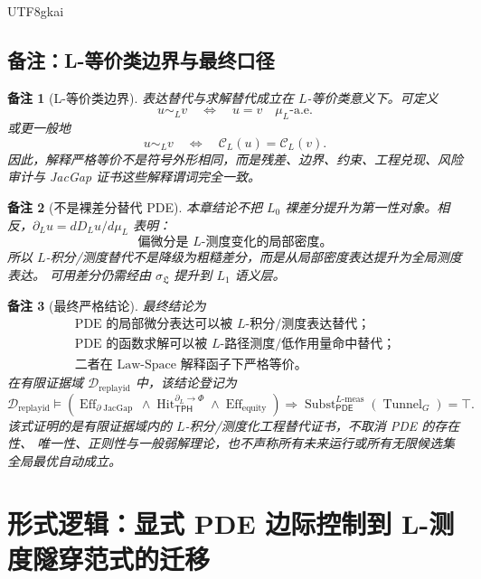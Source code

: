 \documentclass[12pt]{article}
\newtheorem{remark}{备注}[section]
\newcommand{\TPH}{\ensuremath{\mathsf{TPH}}}
\newcommand{\PDE}{\ensuremath{\mathsf{PDE}}}
\DeclareMathOperator{\Eff}{Eff}
\DeclareMathOperator{\Hit}{Hit}
\DeclareMathOperator{\JacGap}{JacGap}
\DeclareMathOperator{\Tunnel}{Tunnel}
\DeclareMathOperator{\Subst}{Subst}
\newcommand{\Lmeas}{L\text{-}\mathrm{meas}}
\begin{document}
\begin{CJK*}{UTF8}{gkai}
\subsection{备注：L-等价类边界与最终口径}
\label{subsec:tex58-l-measure-remarks}

\begin{remark}[L-等价类边界]
表达替代与求解替代成立在 \(L\)-等价类意义下。可定义
\[
  u\sim_L v
  \quad\Longleftrightarrow\quad
  u=v\quad \mu_L\text{-a.e.}
\]
或更一般地
\[
  u\sim_L v
  \quad\Longleftrightarrow\quad
  \mathcal C_L(u)=\mathcal C_L(v).
\]
因此，解释严格等价不是符号外形相同，而是残差、边界、约束、工程兑现、风险审计与 JacGap 证书这些解释谓词完全一致。
\end{remark}

\begin{remark}[不是裸差分替代 PDE]
本章结论不把 \(L_0\) 裸差分提升为第一性对象。相反，\(\partial_Lu=dD_Lu/d\mu_L\) 表明：
\[
  \boxed{
  \text{偏微分是 }L\text{-测度变化的局部密度。}
  }
\]
所以 \(L\)-积分/测度替代不是降级为粗糙差分，而是从局部密度表达提升为全局测度表达。
可用差分仍需经由 \(\sigma_{\mathfrak L}\) 提升到 \(L_1\) 语义层。
\end{remark}

\begin{remark}[最终严格结论]
最终结论为
\[
  \boxed{
  \begin{gathered}
  \text{PDE 的局部微分表达可以被 }L\text{-积分/测度表达替代；}\\
  \text{PDE 的函数求解可以被 }L\text{-路径测度/低作用量命中替代；}\\
  \text{二者在 Law-Space 解释函子下严格等价。}
  \end{gathered}
  }
\]
在有限证据域 \(\mathcal D_{\mathrm{replayid}}\) 中，该结论登记为
\[
  \boxed{
  \mathcal D_{\mathrm{replayid}}
  \models
  \left(
  \Eff_{\partial\JacGap}
  \wedge
  \Hit_{\TPH}^{\partial_L\to\Phi}
  \wedge
  \Eff_{\mathrm{equity}}
  \right)
  \Rightarrow
  \Subst_{\PDE}^{\Lmeas}(\Tunnel_G)=\top.
  }
\]
该式证明的是有限证据域内的 \(L\)-积分/测度化工程替代证书，不取消 PDE 的存在性、
唯一性、正则性与一般弱解理论，也不声称所有未来运行或所有无限候选集全局最优自动成立。
\end{remark}

\clearpage

\section{形式逻辑：显式 PDE 边际控制到 L-测度隧穿范式的迁移}
\label{sec:tex58-explicit-to-lmeasure-tunnel-paradigm}


\end{CJK*}
\end{document}
